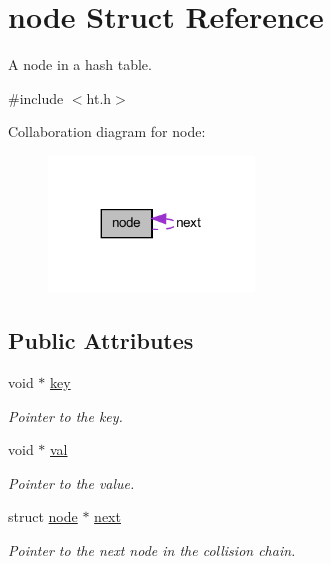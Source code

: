 \hypertarget{structnode}{
\section{node Struct Reference}
\label{structnode}
}


A node in a hash table.  




{\ttfamily \#include $<$ht.h$>$}



Collaboration diagram for node:\nopagebreak
\begin{figure}[H]
\begin{center}
\leavevmode
\includegraphics[width=155pt]{structnode__coll__graph}
\end{center}
\end{figure}
\subsection*{Public Attributes}
\begin{DoxyCompactItemize}
\item 
void $\ast$ \hyperlink{structnode_a72c8a0c41b801c92db89c5078642f28b}{key}
\begin{DoxyCompactList}\small\item\em Pointer to the key. \item\end{DoxyCompactList}\item 
void $\ast$ \hyperlink{structnode_a3866f55c05d50265b730d8cdeec0a1f8}{val}
\begin{DoxyCompactList}\small\item\em Pointer to the value. \item\end{DoxyCompactList}\item 
struct \hyperlink{structnode}{node} $\ast$ \hyperlink{structnode_aa3e8aa83f864292b5a01210f4453fcc0}{next}
\begin{DoxyCompactList}\small\item\em Pointer to the next node in the collision chain. \item\end{DoxyCompactList}\end{DoxyCompactItemize}


